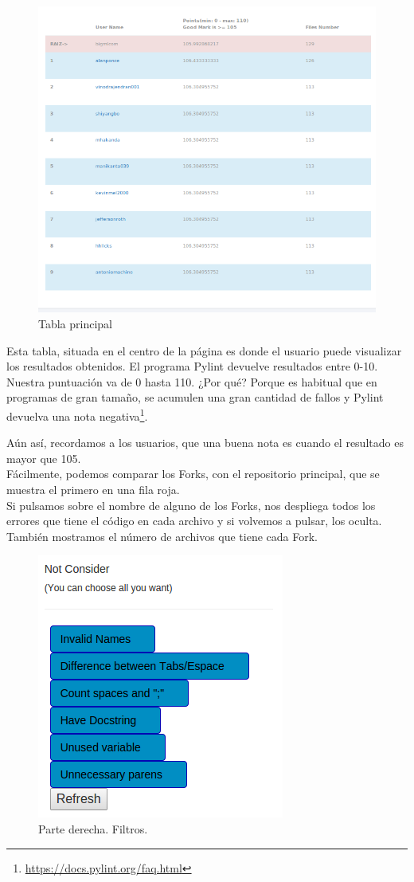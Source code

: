 \documentclass[a4paper, 12pt]{book}
\begin{document}
\begin{figure}[H]
\centering
\includegraphics[scale=0.35]{img/medioana.png} 
\caption{Tabla principal}
\end{figure}

Esta tabla, situada en el centro de la página es donde el usuario puede visualizar los resultados obtenidos. El programa Pylint devuelve resultados entre 0-10. Nuestra puntuación va de 0 hasta 110. ¿Por qué? Porque es habitual que en programas de gran tamaño, se acumulen una gran cantidad de fallos y Pylint devuelva una nota negativa\footnote{\url{https://docs.pylint.org/faq.html}}. 

Aún así, recordamos a los usuarios, que una buena nota es cuando el resultado es mayor que 105.\\
Fácilmente, podemos comparar los Forks, con el repositorio principal, que se muestra el primero en una fila roja.\\
Si pulsamos sobre el nombre de alguno de los Forks, nos despliega todos los errores que tiene el código en cada archivo y si volvemos a pulsar, los oculta.
También mostramos el número de archivos que tiene cada Fork.
\newpage
\begin{figure}[H]
\centering
\includegraphics[scale=0.35]{img/filtrosder.png} 
\caption{Parte derecha. Filtros.}
\end{figure}
\end{document}
